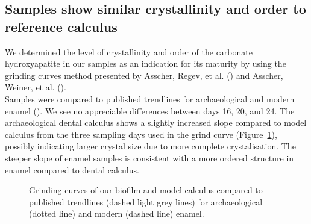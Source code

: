 \documentclass[
  b5paper,
]{book}
\begin{document}
\subsection{Samples show similar crystallinity and order to reference
calculus}\label{samples-show-similar-crystallinity-and-order-to-reference-calculus}

We determined the level of crystallinity and order of the carbonate
hydroxyapatite in our samples as an indication for its maturity by using
the grinding curves method presented by Asscher, Regev, et al.
() and Asscher, Weiner, et
al. ().\\
Samples were compared to published trendlines for archaeological and
modern enamel (). We see no appreciable differences between days 16, 20,
and 24. The archaeological dental calculus shows a slightly increased
slope compared to model calculus from the three sampling days used in
the grind curve (Figure~\ref{fig-grind-curve}), possibly indicating
larger crystal size due to more complete crystalisation. The steeper
slope of enamel samples is consistent with a more ordered structure in
enamel compared to dental calculus.

\begin{figure}


\caption{\label{fig-grind-curve}Grinding curves of our biofilm and model
calculus compared to published trendlines (dashed light grey lines) for
archaeological (dotted line) and modern (dashed line) enamel.}

\end{figure}%
\end{document}
